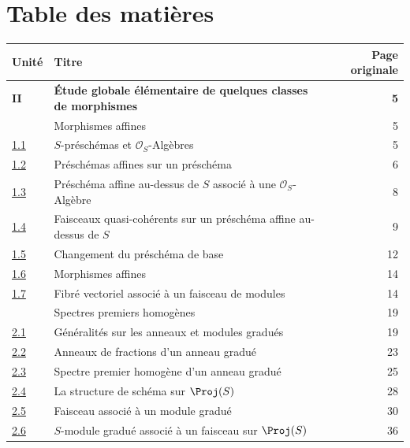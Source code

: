 {}
\section*{Table des matières}
\thispagestyle{plain}

\begingroup
\small
\renewcommand{\arraystretch}{1.04}
\begin{longtable}{@{}p{}p{}r@{}}
\textbf{Unité} & \textbf{Titre} & \textbf{Page originale}\\
\hline
\textbf{II} & \textbf{Étude globale élémentaire de quelques classes de morphismes} & \textbf{5}\\
\hyperref[section:II.1-fr]{\textsection1} & Morphismes affines & 5\\
\hyperref[subsection:II.1.1-fr]{1.1} & $S$-préschémas et $\mathcal{O}_S$-Algèbres & 5\\
\hyperref[subsection:II.1.2-fr]{1.2} & Préschémas affines sur un préschéma & 6\\
\hyperref[subsection:II.1.3-fr]{1.3} & Préschéma affine au-dessus de $S$ associé à une $\mathcal{O}_S$-Algèbre & 8\\
\hyperref[subsection:II.1.4-fr]{1.4} & Faisceaux quasi-cohérents sur un préschéma affine au-dessus de $S$ & 9\\
\hyperref[II.1.5-fr]{1.5} & Changement du préschéma de base & 12\\
\hyperref[II.1.6-fr]{1.6} & Morphismes affines & 14\\
\hyperref[II.1.7-fr]{1.7} & Fibré vectoriel associé à un faisceau de modules & 14\\
\hyperref[section:II.2-fr]{\textsection2} & Spectres premiers homogènes & 19\\
\hyperref[subsection:II.2.1-fr]{2.1} & Généralités sur les anneaux et modules gradués & 19\\
\hyperref[subsection:II.2.2-fr]{2.2} & Anneaux de fractions d'un anneau gradué & 23\\
\hyperref[subsection:II.2.3-fr]{2.3} & Spectre premier homogène d'un anneau gradué & 25\\
\hyperref[subsection:II.2.4-fr]{2.4} & La structure de schéma sur $\Proj(S)$ & 28\\
\hyperref[subsection:II.2.5-fr]{2.5} & Faisceau associé à un module gradué & 30\\
\hyperref[subsection:II.2.6-fr]{2.6} & $S$-module gradué associé à un faisceau sur $\Proj(S)$ & 36\\

\end{longtable}
